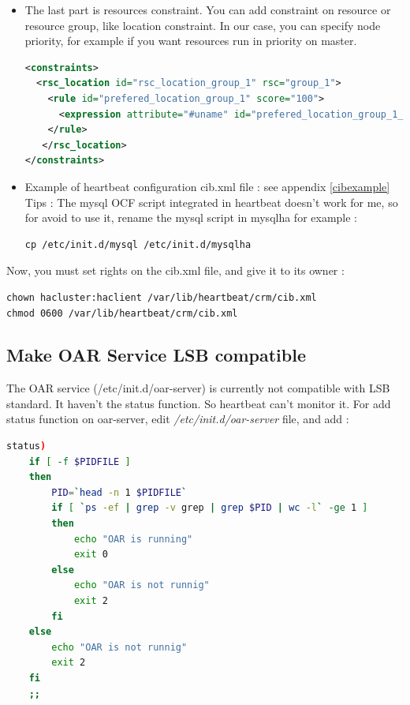\documentclass[a4paper,10pt]{report}
\begin{document}
\begin{itemize}
\begin{itemize}
\end{itemize}

\item The last part is resources constraint. You can add constraint on resource or resource group, like location constraint.
In our case, you can specify node priority, for example if you want resources run in priority on master.
\begin{lstlisting}[language=xml]
<constraints>
  <rsc_location id="rsc_location_group_1" rsc="group_1">
    <rule id="prefered_location_group_1" score="100">
      <expression attribute="#uname" id="prefered_location_group_1_expr" operation="eq" value="NODE-NAME"/>
    </rule>
   </rsc_location>
</constraints>
\end{lstlisting}

\item Example of heartbeat configuration cib.xml file : see appendix \ref{cibexample}\\

Tips : The mysql OCF script integrated in heartbeat doesn't work for me, so for avoid to use it, rename the mysql script in mysqlha for example :
\begin{lstlisting}
cp /etc/init.d/mysql /etc/init.d/mysqlha
\end{lstlisting}

\end{itemize}

Now, you must set rights on the cib.xml file, and give it to its owner :
\begin{lstlisting}
chown hacluster:haclient /var/lib/heartbeat/crm/cib.xml
chmod 0600 /var/lib/heartbeat/crm/cib.xml
\end{lstlisting}




\subsection{Make OAR Service LSB compatible}
The OAR service (/etc/init.d/oar-server) is currently not compatible with LSB standard. It haven't the status function. So heartbeat can't monitor it.
For add status function on oar-server, edit \textit{/etc/init.d/oar-server} file, and add :
\begin{lstlisting}[language=bash]
status)
	if [ -f $PIDFILE ]
	then
		PID=`head -n 1 $PIDFILE`
		if [ `ps -ef | grep -v grep | grep $PID | wc -l` -ge 1 ]
		then
			echo "OAR is running"
			exit 0
		else
			echo "OAR is not runnig"
			exit 2
		fi
	else
		echo "OAR is not runnig"
		exit 2
	fi
	;;
\end{lstlisting}
\end{document}

